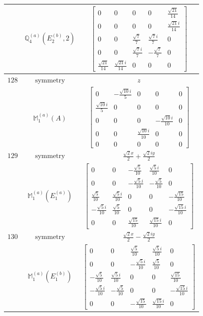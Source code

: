 \documentclass[fleqn,8pt,landscape]{jsarticle}
\begin{document}
\begin{longtable}{ccc}
$  $ & $ \mathbb{Q}_{4}^{(a)}(E_{2}^{(b)},2) $ & $ \begin{bmatrix} 0 & 0 & 0 & 0 & \frac{\sqrt{21}}{14} \\ 0 & 0 & 0 & 0 & \frac{\sqrt{21} i}{14} \\ 0 & 0 & \frac{\sqrt{7}}{7} & \frac{\sqrt{7} i}{7} & 0 \\ 0 & 0 & \frac{\sqrt{7} i}{7} & - \frac{\sqrt{7}}{7} & 0 \\ \frac{\sqrt{21}}{14} & \frac{\sqrt{21} i}{14} & 0 & 0 & 0 \end{bmatrix} $ \\ \hline
$ 128 $ & $ \text{symmetry} $ & $ z $ \\
$  $ & $ \mathbb{M}_{1}^{(a)}(A) $ & $ \begin{bmatrix} 0 & - \frac{\sqrt{10} i}{5} & 0 & 0 & 0 \\ \frac{\sqrt{10} i}{5} & 0 & 0 & 0 & 0 \\ 0 & 0 & 0 & - \frac{\sqrt{10} i}{10} & 0 \\ 0 & 0 & \frac{\sqrt{10} i}{10} & 0 & 0 \\ 0 & 0 & 0 & 0 & 0 \end{bmatrix} $ \\ \hline
$ 129 $ & $ \text{symmetry} $ & $ \frac{\sqrt{2} x}{2} + \frac{\sqrt{2} i y}{2} $ \\
$  $ & $ \mathbb{M}_{1}^{(a)}(E_{1}^{(a)}) $ & $ \begin{bmatrix} 0 & 0 & - \frac{\sqrt{5}}{10} & \frac{\sqrt{5} i}{10} & 0 \\ 0 & 0 & - \frac{\sqrt{5} i}{10} & - \frac{\sqrt{5}}{10} & 0 \\ \frac{\sqrt{5}}{10} & \frac{\sqrt{5} i}{10} & 0 & 0 & - \frac{\sqrt{15}}{10} \\ - \frac{\sqrt{5} i}{10} & \frac{\sqrt{5}}{10} & 0 & 0 & - \frac{\sqrt{15} i}{10} \\ 0 & 0 & \frac{\sqrt{15}}{10} & \frac{\sqrt{15} i}{10} & 0 \end{bmatrix} $ \\ \hline
$ 130 $ & $ \text{symmetry} $ & $ \frac{\sqrt{2} x}{2} - \frac{\sqrt{2} i y}{2} $ \\
$  $ & $ \mathbb{M}_{1}^{(a)}(E_{1}^{(b)}) $ & $ \begin{bmatrix} 0 & 0 & \frac{\sqrt{5}}{10} & \frac{\sqrt{5} i}{10} & 0 \\ 0 & 0 & - \frac{\sqrt{5} i}{10} & \frac{\sqrt{5}}{10} & 0 \\ - \frac{\sqrt{5}}{10} & \frac{\sqrt{5} i}{10} & 0 & 0 & \frac{\sqrt{15}}{10} \\ - \frac{\sqrt{5} i}{10} & - \frac{\sqrt{5}}{10} & 0 & 0 & - \frac{\sqrt{15} i}{10} \\ 0 & 0 & - \frac{\sqrt{15}}{10} & \frac{\sqrt{15} i}{10} & 0 \end{bmatrix} $ \\ \hline

\end{longtable}
\end{document}
